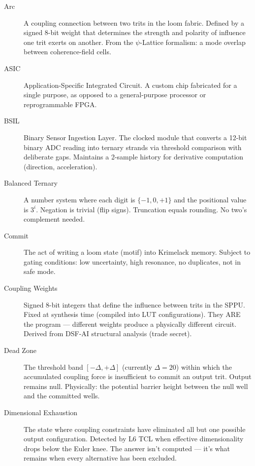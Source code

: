 \documentclass[11pt,a4paper]{article}
\begin{document}
\begin{description}

\item[Arc] A coupling connection between two trits in the loom fabric. Defined by a signed 8-bit weight that determines the strength and polarity of influence one trit exerts on another. From the $\psi$-Lattice formalism: a mode overlap between coherence-field cells.

\item[ASIC] Application-Specific Integrated Circuit. A custom chip fabricated for a single purpose, as opposed to a general-purpose processor or reprogrammable FPGA.

\item[BSIL] Binary Sensor Ingestion Layer. The clocked module that converts a 12-bit binary ADC reading into ternary strands via threshold comparison with deliberate gaps. Maintains a 2-sample history for derivative computation (direction, acceleration).

\item[Balanced Ternary] A number system where each digit is $\{-1, 0, +1\}$ and the positional value is $3^i$. Negation is trivial (flip signs). Truncation equals rounding. No two's complement needed.

\item[Commit] The act of writing a loom state (motif) into Krimelack memory. Subject to gating conditions: low uncertainty, high resonance, no duplicates, not in safe mode.

\item[Coupling Weights] Signed 8-bit integers that define the influence between trits in the SPPU. Fixed at synthesis time (compiled into LUT configurations). They ARE the program --- different weights produce a physically different circuit. Derived from DSF-AI structural analysis (trade secret).

\item[Dead Zone] The threshold band $[-\Delta, +\Delta]$ (currently $\Delta = 20$) within which the accumulated coupling force is insufficient to commit an output trit. Output remains null. Physically: the potential barrier height between the null well and the committed wells.

\item[Dimensional Exhaustion] The state where coupling constraints have eliminated all but one possible output configuration. Detected by L6 TCL when effective dimensionality drops below the Euler knee. The answer isn't computed --- it's what remains when every alternative has been excluded.


\end{description}
\end{document}
